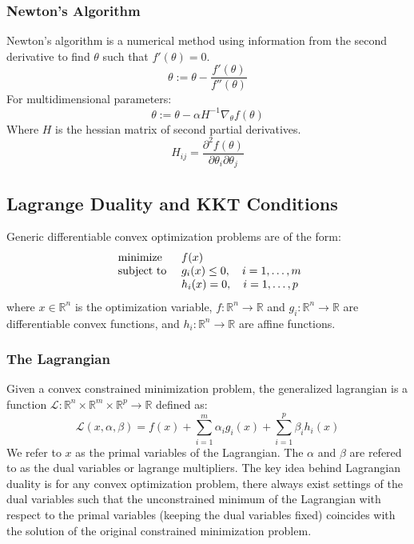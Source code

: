 \documentclass[twoside,twocolumn]{article}
\begin{document}
\subsubsection{Newton's Algorithm}
Newton's algorithm is a numerical method using information from the second
derivative to find $\theta$ such that $f'(\theta)=0$.
\begin{equation}
  \theta := \theta-\frac{f'(\theta)}{f''(\theta)}
\end{equation}
For multidimensional parameters:
\begin{equation}
  \theta := \theta-\alpha H^{-1} \nabla_\theta f(\theta)
\end{equation}
Where $H$ is the hessian matrix of second partial derivatives.
\begin{equation}
  H_{ij} = \frac { \partial ^ { 2 } f ( \theta ) } { \partial \theta _ { i } \partial \theta _ { j } }
\end{equation}
\subsection{Lagrange Duality and KKT Conditions}
Generic differentiable convex optimization problems are of the form:
\begin{equation}
  \begin{array} { l l } { \text { minimize } } & { f ( x ) } \\ { \text { subject to } } & { g _ { i } ( x ) \leq 0 , \quad i = 1 , \ldots , m } \\ { } & { h _ { i } ( x ) = 0 , \quad i = 1 , \ldots , p } \end{array}
\end{equation}
where $x\in \mathbb{R}^n$ is the optimization variable,
$f: \mathbb{R}^n \to \mathbb{R}$ and $g_i: \mathbb{R}^n \to \mathbb{R}$
are differentiable convex functions, and $h_i: \mathbb{R}^n \to \mathbb{R}$
are affine functions.
\subsubsection{The Lagrangian}
Given a convex constrained minimization problem, the generalized lagrangian
is a function $\mathcal{L}: \mathbb{R}^n \times \mathbb{R}^m \times \mathbb{R}^p
\to \mathbb{R}$ defined as:
\begin{equation}
  \mathcal { L } ( x , \alpha , \beta ) = f ( x ) + \sum _ { i = 1 } ^ { m } \alpha _ { i } g _ { i } ( x ) + \sum _ { i = 1 } ^ { p } \beta _ { i } h _ { i } ( x )
\end{equation}
We refer to $x$ as the primal variables of the Lagrangian. The $\alpha$ and
$\beta$ are refered to as the dual variables or lagrange multipliers. The
key idea behind Lagrangian duality is for any convex optimization problem,
there always exist settings of the dual variables such that the unconstrained
minimum of the Lagrangian with respect to the primal variables (keeping the
dual variables fixed) coincides with the solution of the original constrained
minimization problem.
\end{document}

